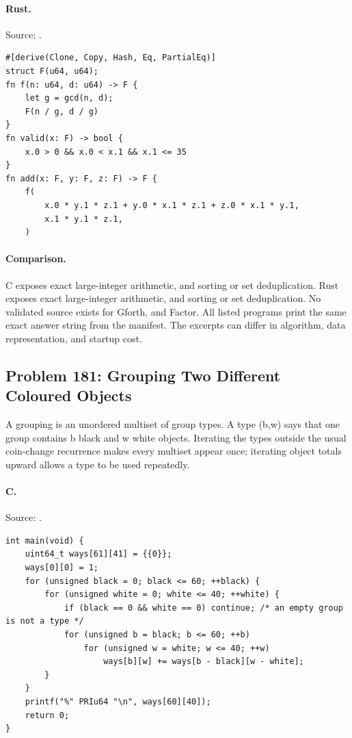 \paragraph{Rust.} Source: .
\begin{lstlisting}
#[derive(Clone, Copy, Hash, Eq, PartialEq)]
struct F(u64, u64);
fn f(n: u64, d: u64) -> F {
    let g = gcd(n, d);
    F(n / g, d / g)
}
fn valid(x: F) -> bool {
    x.0 > 0 && x.0 < x.1 && x.1 <= 35
}
fn add(x: F, y: F, z: F) -> F {
    f(
        x.0 * y.1 * z.1 + y.0 * x.1 * z.1 + z.0 * x.1 * y.1,
        x.1 * y.1 * z.1,
    )
\end{lstlisting}

\paragraph{Comparison.}
C exposes exact large-integer arithmetic, and sorting or set deduplication. Rust exposes exact large-integer arithmetic, and sorting or set deduplication.
No validated source exists for Gforth, and Factor.
All listed programs print the same exact answer string from the manifest. The excerpts can differ in algorithm, data representation, and startup cost.

\subsection{Problem 181: Grouping Two Different Coloured Objects}
\label{walkthrough:p181}
A grouping is an unordered multiset of group types. A type (b,w) says that one group contains b black and w white objects. Iterating the types outside the usual coin-change recurrence makes every multiset appear once; iterating object totals upward allows a type to be used repeatedly.

\paragraph{C.} Source: .
\begin{lstlisting}
int main(void) {
    uint64_t ways[61][41] = {{0}};
    ways[0][0] = 1;
    for (unsigned black = 0; black <= 60; ++black) {
        for (unsigned white = 0; white <= 40; ++white) {
            if (black == 0 && white == 0) continue; /* an empty group is not a type */
            for (unsigned b = black; b <= 60; ++b)
                for (unsigned w = white; w <= 40; ++w)
                    ways[b][w] += ways[b - black][w - white];
        }
    }
    printf("%" PRIu64 "\n", ways[60][40]);
    return 0;
}
\end{lstlisting}

